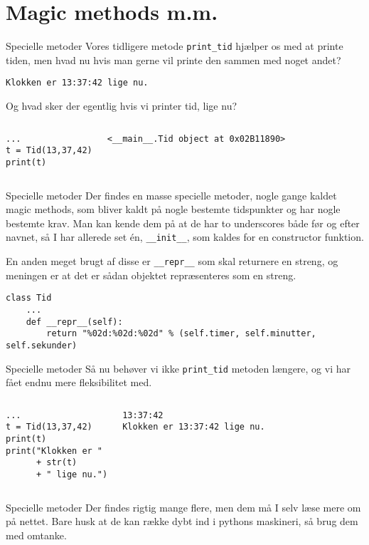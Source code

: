 \section{Magic methods m.m.}
\begin{frame}[fragile]{Specielle metoder}
Vores tidligere metode \texttt{print\_tid} hjælper os med at printe tiden, men hvad nu hvis man gerne vil printe den sammen med noget andet?
\begin{lstlisting}[style=python]
Klokken er 13:37:42 lige nu.
\end{lstlisting}
\pause
Og hvad sker der egentlig hvis vi printer tid, lige nu?
\begin{columns}
	\begin{lstlisting}[style=python]
...
t = Tid(13,37,42)
print(t)
	\end{lstlisting}
	\pause
	\begin{lstlisting}[style=python]
<__main__.Tid object at 0x02B11890>
	\end{lstlisting}
\end{columns}
\end{frame}


\begin{frame}[fragile]{Specielle metoder}
Der findes en masse specielle metoder, nogle gange kaldet magic methods, som bliver kaldt på nogle bestemte tidspunkter og har nogle bestemte krav. Man kan kende dem på at de har to underscores både før og efter navnet, så I har allerede set én, \texttt{\_\_init\_\_}, som kaldes for en constructor funktion.

En anden meget brugt af disse er \texttt{\_\_repr\_\_} som skal returnere en streng, og meningen er at det er sådan objektet repræsenteres som en streng.
\begin{lstlisting}[style=python]
class Tid
	...
	def __repr__(self):
	    return "%02d:%02d:%02d" % (self.timer, self.minutter, self.sekunder)
\end{lstlisting}
\end{frame}

\begin{frame}[fragile]{Specielle metoder}
Så nu behøver vi ikke \texttt{print\_tid} metoden længere, og vi har fået endnu mere fleksibilitet med.
\begin{columns}
	\begin{lstlisting}[style=python]
...
t = Tid(13,37,42)
print(t)
print("Klokken er " 
      + str(t) 
      + " lige nu.")
	\end{lstlisting}
	\pause
	\begin{lstlisting}[style=python]
13:37:42
Klokken er 13:37:42 lige nu.
	\end{lstlisting}
\end{columns}
\end{frame}

\begin{frame}[fragile]{Specielle metoder}
Der findes rigtig mange flere, men dem må I selv læse mere om på nettet. Bare husk at de kan række dybt ind i pythons maskineri, så brug dem med omtanke.
\end{frame}

